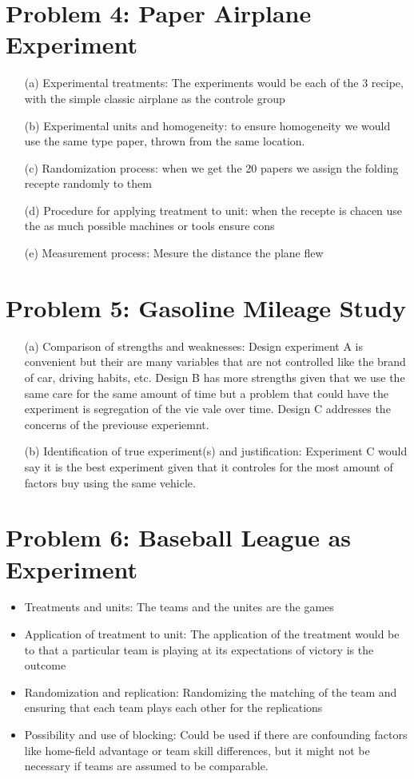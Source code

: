 \documentclass[10pt, oneside]{article}
\begin{document}
\section*{Problem 4: Paper Airplane Experiment}
\begin{itemize}
	\item[(a)] Experimental treatments: The experiments would be each of the 3 recipe, with the simple classic airplane as the controle group
	\item[(b)] Experimental units and homogeneity: to ensure homogeneity we would use the same type paper, thrown from the same location.
	\item[(c)] Randomization process: when we get the 20 papers we assign the folding recepte randomly to them
	\item[(d)] Procedure for applying treatment to unit: when the recepte is chacen use the as much possible machines or tools ensure cons
	\item[(e)] Measurement process: Mesure the distance the plane flew
\end{itemize}

\section*{Problem 5: Gasoline Mileage Study}
\begin{itemize}
	\item[(a)] Comparison of strengths and weaknesses:
	      Design experiment A is convenient but their are many variables that are not controlled like the
	      brand of car, driving habits, etc. Design B has more strengths given that we use the same care for the same amount of time but a problem that could
	      have the experiment is segregation of the vie vale over time. Design C addresses the concerns of the previouse experiemnt.
	\item[(b)] Identification of true experiment(s) and justification:
	      Experiment C would say it is the best experiment given that it controles for the most amount of factors buy using the same vehicle.
\end{itemize}

\section*{Problem 6: Baseball League as Experiment}
\begin{itemize}
	\item Treatments and units: The teams and the unites are the games
	\item Application of treatment to unit: The application of the treatment would be to
	      that a particular team is playing at its expectations of victory is the outcome
	\item Randomization and replication: Randomizing the matching of the team and ensuring that each team plays each other for the replications
	\item Possibility and use of blocking: Could be used if there are confounding factors like home-field advantage or team skill differences, but it might not be necessary if teams are assumed to be comparable.
\end{itemize}
\end{document}

